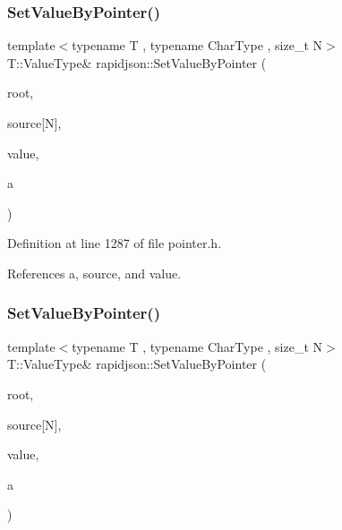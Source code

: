 \subsubsection{\texorpdfstring{SetValueByPointer()}{SetValueByPointer()}\hspace{0.1cm}{\footnotesize\ttfamily [4/12]}}
{\footnotesize\ttfamily template$<$typename T , typename Char\+Type , size\+\_\+t N$>$ \\
T\+::\+Value\+Type\& rapidjson\+::\+Set\+Value\+By\+Pointer (\begin{DoxyParamCaption}\item[{T \&}]{root,  }\item[{const Char\+Type(\&)}]{source\mbox{[}\+N\mbox{]},  }\item[{typename T\+::\+Value\+Type \&}]{value,  }\item[{typename T\+::\+Allocator\+Type \&}]{a }\end{DoxyParamCaption})}



Definition at line 1287 of file pointer.\+h.


\begin{DoxyCode}{0}

\end{DoxyCode}


References a, source, and value.

\mbox{\label{namespacerapidjson_a4c7a1df544ef6745922b7311cbbe98f0}} 
\subsubsection{\texorpdfstring{SetValueByPointer()}{SetValueByPointer()}\hspace{0.1cm}{\footnotesize\ttfamily [5/12]}}
{\footnotesize\ttfamily template$<$typename T , typename Char\+Type , size\+\_\+t N$>$ \\
T\+::\+Value\+Type\& rapidjson\+::\+Set\+Value\+By\+Pointer (\begin{DoxyParamCaption}\item[{T \&}]{root,  }\item[{const Char\+Type(\&)}]{source\mbox{[}\+N\mbox{]},  }\item[{const typename T\+::\+Value\+Type \&}]{value,  }\item[{typename T\+::\+Allocator\+Type \&}]{a }\end{DoxyParamCaption})}



